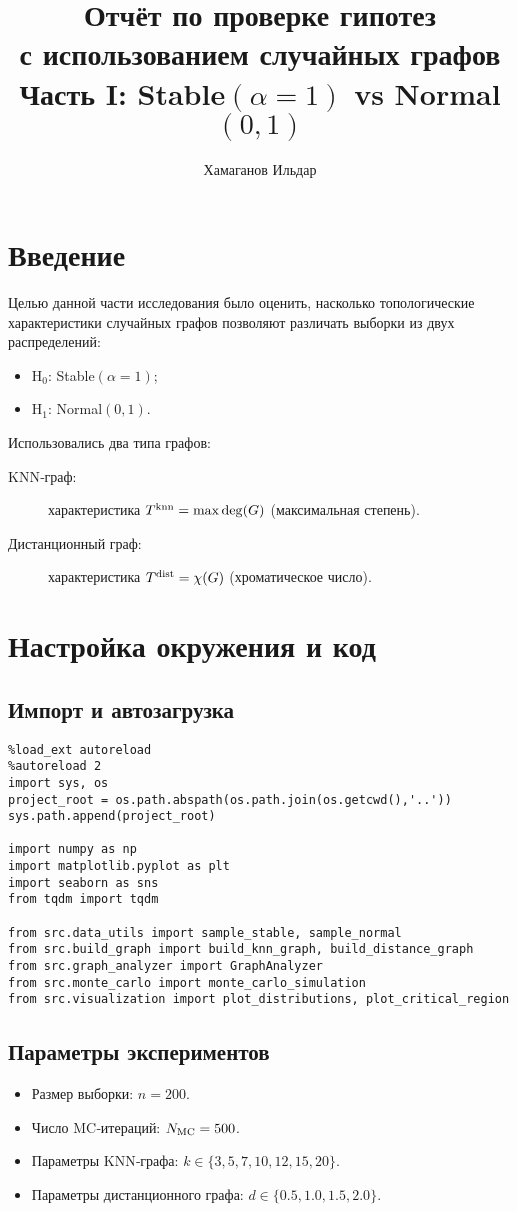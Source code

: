 \documentclass[12pt,a4paper]{article}
\title{Отчёт по проверке гипотез \\ с использованием случайных графов \\ \small Часть I: Stable$(\alpha=1)$ vs Normal$(0,1)$}
\author{Хамаганов Ильдар}
\date{}
\begin{document}
\maketitle

\section*{Введение}
Целью данной части исследования было оценить, насколько топологические характеристики 
случайных графов позволяют различать выборки из двух распределений:
\begin{itemize}
  \item H$_0$: Stable$(\alpha=1)$;
  \item H$_1$: Normal$(0,1)$.
\end{itemize}
Использовались два типа графов:
\begin{description}
  \item[KNN‑граф:] характеристика $T^{\rm knn} = \max\deg(G)$ (максимальная степень).
  \item[Дистанционный граф:] характеристика $T^{\rm dist} = \chi(G)$ (хроматическое число).
\end{description}

\section{Настройка окружения и код}
\subsection*{Импорт и автозагрузка}
\begin{verbatim}
%load_ext autoreload
%autoreload 2
import sys, os
project_root = os.path.abspath(os.path.join(os.getcwd(),'..'))
sys.path.append(project_root)

import numpy as np
import matplotlib.pyplot as plt
import seaborn as sns
from tqdm import tqdm

from src.data_utils import sample_stable, sample_normal
from src.build_graph import build_knn_graph, build_distance_graph
from src.graph_analyzer import GraphAnalyzer
from src.monte_carlo import monte_carlo_simulation
from src.visualization import plot_distributions, plot_critical_region
\end{verbatim}

\subsection*{Параметры экспериментов}
\begin{itemize}
  \item Размер выборки: $n=200$.
  \item Число MC‑итераций: $N_{\rm MC}=500$.
  \item Параметры KNN‑графа: $k\in\{3,5,7,10,12,15,20\}$.
  \item Параметры дистанционного графа: $d\in\{0.5,1.0,1.5,2.0\}$.
\end{itemize}
\end{document}

